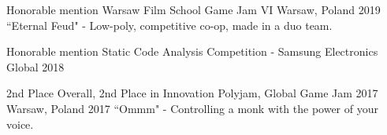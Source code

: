 
\begin{cvhonors}

  \cvhonor
    {Honorable mention} %
    {Warsaw Film School Game Jam VI} %
    {Warsaw, Poland} %
    {2019} %
  \cvhonordet %
    {} 
    {``Eternal Feud" - Low-poly, competitive co-op, made in a duo team. } %
    {} 
    {} 

  \cvhonor
    {Honorable mention} %
    {Static Code Analysis Competition - Samsung Electronics} %
    {Global} %
    {2018} %

  \cvhonor
    {2nd Place Overall, 2nd Place in Innovation} %
    {Polyjam, Global Game Jam 2017} %
    {Warsaw, Poland} %
    {2017} %
  \cvhonordet %
    {} 
    {``Ommm" - Controlling a monk with the power of your voice. } %
    {} 
    {} 

\end{cvhonors}
